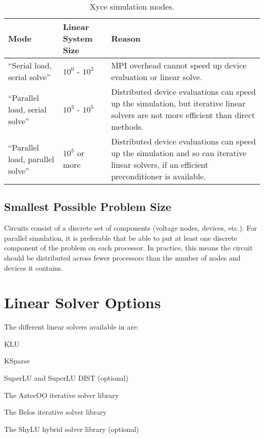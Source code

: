 \begin{table}[htp]
\caption[\Xyce{} Simulation Modes]{Xyce simulation modes.}
\label{tab:sim:modes}
\begin{center}
\begin{tabular}{| p{5cm} | p{3.5cm} | p{7cm} |}
\hline
Mode & Linear System Size & Reason \\
\hline
``Serial load, serial solve'' & $10^0$ - $10^3$ & MPI overhead cannot speed up device evaluation or linear solve. \\
``Parallel load, serial solve'' & $10^3$ - $10^5$ & Distributed device evaluations can speed up the simulation, but 
iterative linear solvers are not more efficient than direct methods.\\
``Parallel load, parallel solve'' & $10^5$ or more & Distributed device evaluations can speed up the simulation and
so can iterative linear solvers, if an efficient preconditioner is available. \\
\hline
\end{tabular}
\end{center}
\end{table}

\subsection{Smallest Possible Problem Size}
Circuits consist of a discrete set of components (voltage nodes, devices, etc.). For parallel simulation, it is preferable that \Xyce{} be able to put 
at least one discrete component of the problem on each processor. In practice, this means the circuit should be distributed across fewer processors than 
the number of nodes and devices it contains.

\section{Linear Solver Options}
\label{LinearSolver_Options}

The different linear solvers available in \Xyce{} are:

\begin{XyceItemize}
  \item KLU
  \item KSparse
  \item SuperLU and SuperLU DIST (optional)
  \item The AztecOO iterative solver library
  \item The Belos iterative solver library
  \item The ShyLU hybrid solver library (optional)
\end{XyceItemize}


